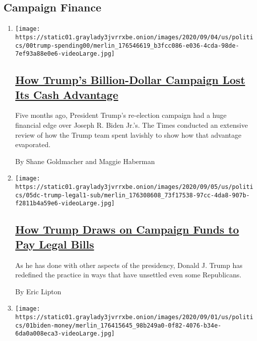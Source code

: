 \hypertarget{campaign-finance}{%
\subsection{Campaign Finance}\label{campaign-finance}}

\begin{enumerate}
\def\labelenumi{\arabic{enumi}.}
\item
  \texttt{[image: https://static01.graylady3jvrrxbe.onion/images/2020/09/04/us/politics/00trump-spending00/merlin\_176546619\_b3fcc086-e036-4cda-98de-7ef93a88e0e6-videoLarge.jpg]}

  \hypertarget{how-trumps-billion-dollar-campaign-lost-its-cash-advantage}{%
  \subsection{\texorpdfstring{\href{/2020/09/07/us/politics/trump-election-campaign-fundraising.html}{How
  Trump's Billion-Dollar Campaign Lost Its Cash
  Advantage}}{How Trump's Billion-Dollar Campaign Lost Its Cash Advantage}}\label{how-trumps-billion-dollar-campaign-lost-its-cash-advantage}}

  Five months ago, President Trump's re-election campaign had a huge
  financial edge over Joseph R. Biden Jr.'s. The Times conducted an
  extensive review of how the Trump team spent lavishly to show how that
  advantage evaporated.

  By Shane Goldmacher and Maggie Haberman
\item
  \texttt{[image: https://static01.graylady3jvrrxbe.onion/images/2020/09/05/us/politics/05dc-trump-legal1-sub/merlin\_176308608\_73f17538-97cc-4da8-907b-f2811b4a59e6-videoLarge.jpg]}

  \hypertarget{how-trump-draws-on-campaign-funds-to-pay-legal-bills}{%
  \subsection{\texorpdfstring{\href{/2020/09/05/us/politics/trump-campaign-funds-legal-bills.html}{How
  Trump Draws on Campaign Funds to Pay Legal
  Bills}}{How Trump Draws on Campaign Funds to Pay Legal Bills}}\label{how-trump-draws-on-campaign-funds-to-pay-legal-bills}}

  As he has done with other aspects of the presidency, Donald J. Trump
  has redefined the practice in ways that have unsettled even some
  Republicans.

  By Eric Lipton
\item
  \texttt{[image: https://static01.graylady3jvrrxbe.onion/images/2020/09/01/us/politics/01biden-money/merlin\_176415645\_98b249a0-0f82-4076-b34e-6da0a008eca3-videoLarge.jpg]}


\end{enumerate}
